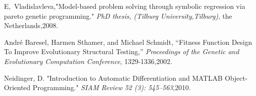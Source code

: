 \documentclass[10pt,journal,compsoc]{IEEEtran}
\begin{document}
\begin{thebibliography}{10}
	E,~Vladislavleva,"{Model-based problem solving through symbolic regression via pareto genetic programming.}"
	\emph{PhD thesis, (Tilburg University,Tilburg)}, the Netherlands,2008.


			André Baresel, Harmen Sthamer, and Michael Schmidt, “{Fitness Function Design To Improve Evolutionary Structural Testing},” \emph{Proceedings of the Genetic and Evolutionary Computation Conference}, 1329-1336,2002.

	

	Neidinger, D. "{Introduction to Automatic Differentiation and MATLAB Object-Oriented Programming.}" \emph{SIAM Review 52 (3): 545–563},2010.

	

	
	
	
\end{thebibliography}









\vfill

\end{document}
